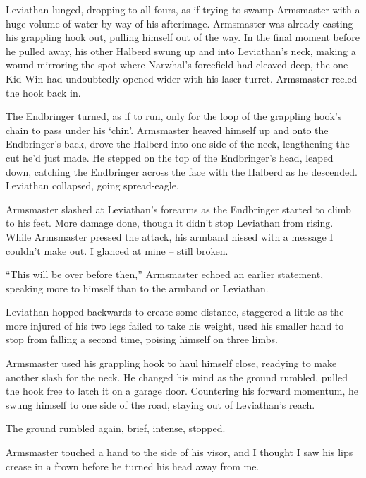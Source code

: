Leviathan lunged, dropping to all fours, as if trying to swamp Armsmaster with a huge volume of water by way of his afterimage.  Armsmaster was already casting his grappling hook out, pulling himself out of the way.  In the final moment before he pulled away, his other Halberd swung up and into Leviathan's neck, making a wound mirroring the spot where Narwhal's forcefield had cleaved deep, the one Kid Win had undoubtedly opened wider with his laser turret.  Armsmaster reeled the hook back in.



The Endbringer turned, as if to run, only for the loop of the grappling hook's chain to pass under his `chin'.  Armsmaster heaved himself up and onto the Endbringer's back, drove the Halberd into one side of the neck, lengthening the cut he'd just made.  He stepped on the top of the Endbringer's head, leaped down, catching the Endbringer across the face with the Halberd as he descended.  Leviathan collapsed, going spread-eagle.



Armsmaster slashed at Leviathan's forearms as the Endbringer started to climb to his feet.  More damage done, though it didn't stop Leviathan from rising.  While Armsmaster pressed the attack, his armband hissed with a message I couldn't make out.  I glanced at mine – still broken.



``This will be over before then,'' Armsmaster echoed an earlier statement, speaking more to himself than to the armband or Leviathan.



Leviathan hopped backwards to create some distance, staggered a little as the more injured of his two legs failed to take his weight, used his smaller hand to stop from falling a second time, poising himself on three limbs.



Armsmaster used his grappling hook to haul himself close, readying to make another slash for the neck.  He changed his mind as the ground rumbled, pulled the hook free to latch it on a garage door.  Countering his forward momentum, he swung himself to one side of the road, staying out of Leviathan's reach.



The ground rumbled again, brief, intense, stopped.



Armsmaster touched a hand to the side of his visor, and I thought I saw his lips crease in a frown before he turned his head away from me.



